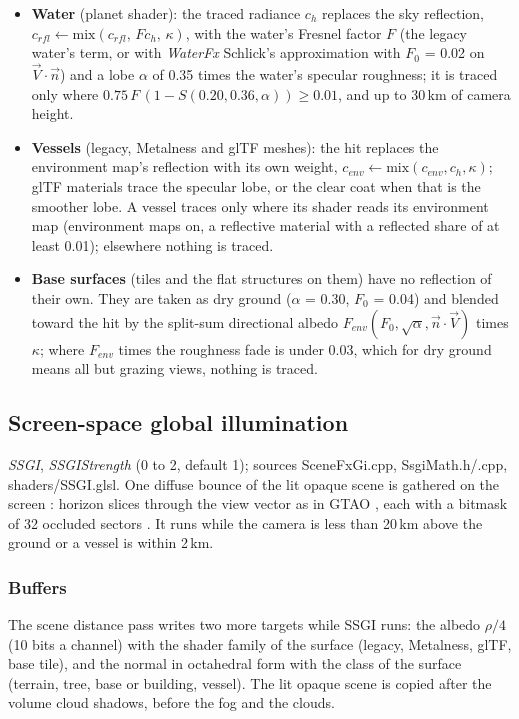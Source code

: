 \documentclass[Orbiter Technical Reference.tex]{subfiles}
\begin{document}
\begin{sloppypar}
\begin{itemize}
\item \textbf{Water} (planet shader): the traced radiance $c_{h}$ replaces the sky reflection, $c_{rfl} \leftarrow \mathrm{mix}(c_{rfl},\, F c_{h},\, \kappa)$, with the water's Fresnel factor $F$ (the legacy water's term, or with \textit{WaterFx} Schlick's approximation \cite{schlick1994} with $F_{0}$ = 0.02 on $\vec{V}\cdot\vec{n}$) and a lobe $\alpha$ of 0.35 times the water's specular roughness; it is traced only where $0.75\,F\,(1 - S(0.20, 0.36, \alpha)) \ge 0.01$, and up to 30\,km of camera height.
\item \textbf{Vessels} (legacy, Metalness and glTF meshes): the hit replaces the environment map's reflection with its own weight, $c_{env} \leftarrow \mathrm{mix}(c_{env}, c_{h}, \kappa)$; glTF materials trace the specular lobe, or the clear coat when that is the smoother lobe. A vessel traces only where its shader reads its environment map (environment maps on, a reflective material with a reflected share of at least 0.01); elsewhere nothing is traced.
\item \textbf{Base surfaces} (tiles and the flat structures on them) have no reflection of their own. They are taken as dry ground ($\alpha$ = 0.30, $F_{0}$ = 0.04) and blended toward the hit by the split-sum directional albedo \cite{karis2014mobile} $F_{env}(F_{0}, \sqrt{\alpha}, \vec{n}\cdot\vec{V})$ times $\kappa$; where $F_{env}$ times the roughness fade is under 0.03, which for dry ground means all but grazing views, nothing is traced.
\end{itemize}



\subsection{Screen-space global illumination}\label{sec:vk_ssgi}
\textit{SSGI}, \textit{SSGIStrength} (0 to 2, default 1); sources SceneFxGi.cpp, SsgiMath.h/.cpp, shaders/SSGI.glsl. One diffuse bounce of the lit opaque scene is gathered on the screen \cite{ritschel2009}: horizon slices through the view vector as in GTAO \cite{jimenez2016}, each with a bitmask of 32 occluded sectors \cite{therrien2023}. It runs while the camera is less than 20\,km above the ground or a vessel is within 2\,km.

\subsubsection{Buffers}
The scene distance pass writes two more targets while SSGI runs: the albedo $\rho/4$ (10 bits a channel) with the shader family of the surface (legacy, Metalness, glTF, base tile), and the normal in octahedral form \cite{cigolle2014} with the class of the surface (terrain, tree, base or building, vessel). The lit opaque scene is copied after the volume cloud shadows, before the fog and the clouds.


\end{sloppypar}
\end{document}

